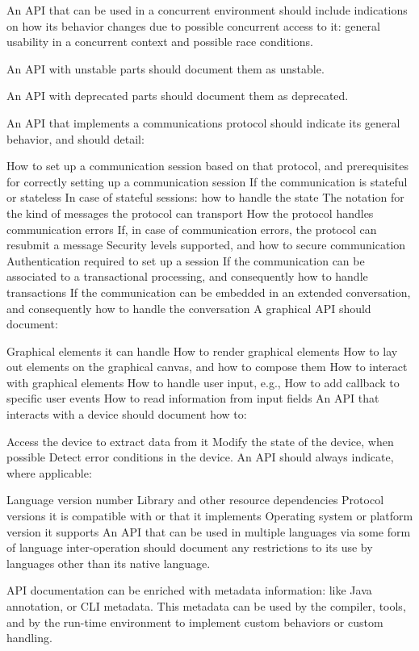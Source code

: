 An API that can be used in a concurrent environment should include indications on how its behavior changes due to possible concurrent access to it: general usability in a concurrent context and possible race conditions.

An API with unstable parts should document them as unstable.

An API with deprecated parts should document them as deprecated.

An API that implements a communications protocol should indicate its general behavior, and should detail:

How to set up a communication session based on that protocol, and prerequisites for correctly setting up a communication session
If the communication is stateful or stateless
In case of stateful sessions: how to handle the state
The notation for the kind of messages the protocol can transport
How the protocol handles communication errors
If, in case of communication errors, the protocol can resubmit a message
Security levels supported, and how to secure communication
Authentication required to set up a session
If the communication can be associated to a transactional processing, and consequently how to handle transactions
If the communication can be embedded in an extended conversation, and consequently how to handle the conversation
A graphical API should document:

Graphical elements it can handle
How to render graphical elements
How to lay out elements on the graphical canvas, and how to compose them
How to interact with graphical elements
How to handle user input, e.g.,
How to add callback to specific user events
How to read information from input fields
An API that interacts with a device should document how to:

Access the device to extract data from it
Modify the state of the device, when possible
Detect error conditions in the device.
An API should always indicate, where applicable:

Language version number
Library and other resource dependencies
Protocol versions it is compatible with or that it implements
Operating system or platform version it supports
An API that can be used in multiple languages via some form of language inter-operation should document any restrictions to its use by languages other than its native language.

API documentation can be enriched with metadata information: like Java annotation, or CLI metadata. This metadata can be used by the compiler, tools, and by the run-time environment to implement custom behaviors or custom handling.

